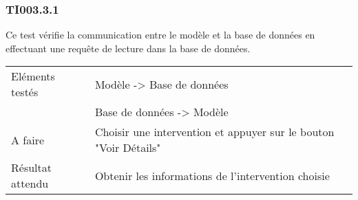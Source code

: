 
\subsubsection{TI003.3.1}
\label{TI003.3.1}
  		Ce test vérifie la communication entre le modèle et la base de données en effectuant une requête de lecture dans la base de données.
  		\begin{center}
    	 		\begin{tabular}[h]{|p{}|p{}|}
			\hline
				Eléments testés & Modèle -> Base de données  \\
							    &  Base de données -> Modèle \\\hline
    				A faire & Choisir une intervention et appuyer sur le bouton "Voir Détails" \\\hline
    				Résultat attendu & Obtenir les informations de l'intervention choisie \\\hline
     		\end{tabular}
  		\end{center}	
